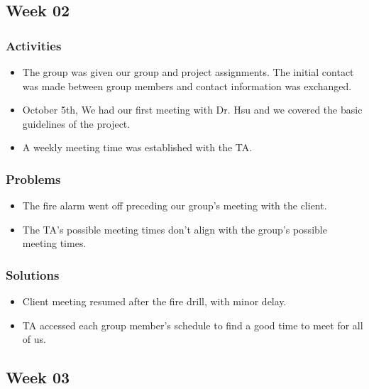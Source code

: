 \documentclass[letterpaper, onecolumn, draftclsnofoot, 10pt, compsoc]{IEEEtran}
\begin{document}
\begin{singlespace}
    \subsection{Week 02}
    	\subsubsection{Activities}
        	\begin{itemize}
        	\item The group was given our group and project assignments. The initial contact was made between group members and contact information was exchanged.
            \item October 5th, We had our first meeting with Dr. Hsu and we covered the basic guidelines of the project.
            \item A weekly meeting time was established with the TA.
        	\end{itemize}
        \subsubsection{Problems}
        \begin{itemize}
        	\item The fire alarm went off preceding our group's meeting with the client.
        	\item The TA's possible meeting times don't align with the group's possible meeting times.
        \end{itemize}
        \subsubsection{Solutions}
        \begin{itemize}
        	\item Client meeting resumed after the fire drill, with minor delay.
            \item TA accessed each group member's schedule to find a good time to meet for all of us.
        \end{itemize}
        
     \subsection{Week 03}

\end{singlespace}
\end{document}
